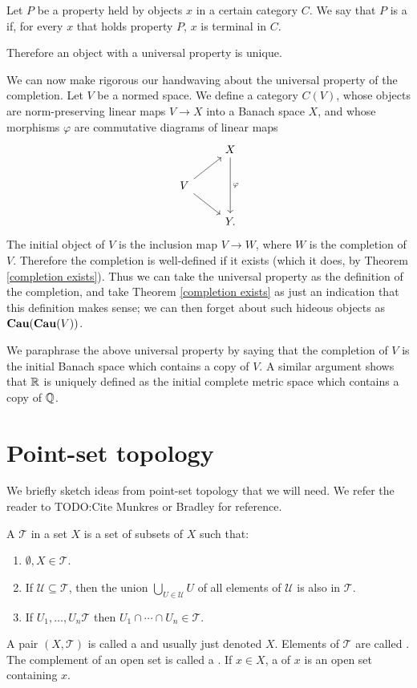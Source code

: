 \begin{definition}
Let $P$ be a property held by objects $x$ in a certain category $C$.
We say that $P$ is a  if, for every $x$ that holds property $P$, $x$ is terminal in $C$.
\end{definition}

Therefore an object with a universal property is unique.

We can now make rigorous our handwaving about the universal property of the completion.
Let $V$ be a normed space. We define a category $C(V)$, whose objects are norm-preserving linear maps $V \to X$ into a Banach space $X$, and whose morphisms $\varphi$ are commutative diagrams of linear maps
$$\begin{tikzcd}&X \arrow[dd,"\varphi"]\\
V \arrow[ur] \arrow[dr]\\
&Y.\end{tikzcd}$$
The initial object of $V$ is the inclusion map $V \to W$, where $W$ is the completion of $V$.
Therefore the completion is well-defined if it exists (which it does, by Theorem \ref{completion exists}).
Thus we can take the universal property as the definition of the completion, and take Theorem \ref{completion exists} as just an indication that this definition makes sense; we can then forget about such hideous objects as $\mathbf{Cau}(\mathbf{Cau}(V))$.

We paraphrase the above universal property by saying that the completion of $V$ is the initial Banach space which contains a copy of $V$.
A similar argument shows that $\mathbb{R}$ is uniquely defined as the initial complete metric space which contains a copy of $\mathbb{Q}$.

\section{Point-set topology}
We briefly sketch ideas from point-set topology that we will need.
We refer the reader to TODO:Cite Munkres or Bradley for reference.

\begin{definition}
A  $\mathcal T$ in a set $X$ is a set of subsets of $X$ such that:
\begin{enumerate}
\item $\emptyset, X \in \mathcal T$.
\item If $\mathcal U \subseteq \mathcal T$, then the union $\bigcup_{U \in \mathcal U} U$ of all elements of $\mathcal U$ is also in $\mathcal T$.
\item If $U_1, \dots, U_n \mathcal T$ then $U_1 \cap \cdots \cap U_n \in \mathcal T$.
\end{enumerate}
A pair $(X, \mathcal T)$ is called a  and usually just denoted $X$.
Elements of $\mathcal T$ are called .
The complement of an open set is called a .
If $x \in X$, a  of $x$ is an open set containing $x$.
\end{definition}

